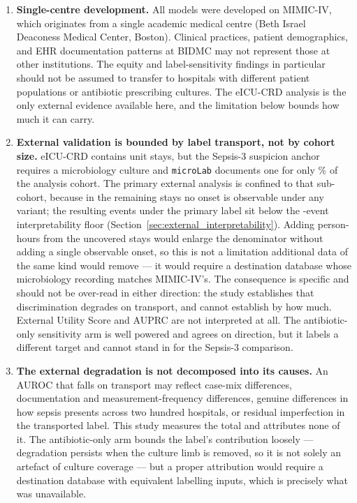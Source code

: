 \begin{enumerate}
    \item \textbf{Single-centre development.} All models were developed on
    MIMIC-IV, which originates from a single academic medical centre (Beth
    Israel Deaconess Medical Center, Boston). Clinical practices, patient
    demographics, and EHR documentation patterns at BIDMC may not represent
    those at other institutions. The equity and label-sensitivity findings in
    particular should not be assumed to transfer to hospitals with different
    patient populations or antibiotic prescribing cultures. The eICU-CRD
    analysis is the only external evidence available here, and the limitation
    below bounds how much it can carry.

    \item \textbf{External validation is bounded by label transport, not by
    cohort size.} eICU-CRD contains \pcExtNCohortStays{} unit stays, but the
    Sepsis-3 suspicion anchor requires a microbiology culture and
    \texttt{microLab} documents one for only \pcExtMicroCoverage\% of the
    analysis cohort. The primary external analysis is confined to that
    sub-cohort, because in the remaining stays no onset is observable under any
    variant; the resulting \pcExtNEventsB{} events under the primary label sit
    below the \pcExtMinEvents{}-event interpretability floor
    (Section~\ref{sec:external_interpretability}). Adding person-hours from the
    uncovered stays would enlarge the denominator without adding a single
    observable onset, so this is not a limitation additional data of the same
    kind would remove --- it would require a destination database whose
    microbiology recording matches MIMIC-IV's. The consequence is specific and
    should not be over-read in either direction: the study establishes that
    discrimination degrades on transport, and cannot establish by how much.
    External Utility Score and AUPRC are not interpreted at all. The
    antibiotic-only sensitivity arm is well powered and agrees on direction,
    but it labels a different target and cannot stand in for the Sepsis-3
    comparison.

    \item \textbf{The external degradation is not decomposed into its causes.}
    An AUROC that falls on transport may reflect case-mix differences,
    documentation and measurement-frequency differences, genuine differences in
    how sepsis presents across two hundred hospitals, or residual imperfection
    in the transported label. This study measures the total and attributes none
    of it. The antibiotic-only arm bounds the label's contribution loosely ---
    degradation persists when the culture limb is removed, so it is not solely
    an artefact of culture coverage --- but a proper attribution would require
    a destination database with equivalent labelling inputs, which is precisely
    what was unavailable.


\end{enumerate}
